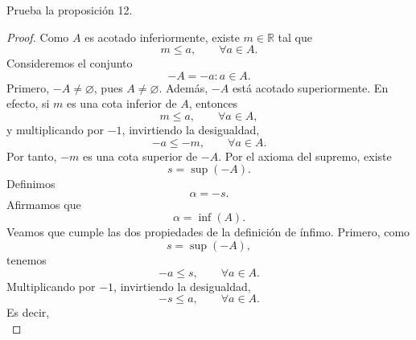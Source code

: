 \documentclass[12pt,a4paper]{article}
\begin{document}
    \begin{problema}
        Prueba la proposición 12.
    \end{problema}

    \begin{proof}
        Como $A$ es acotado inferiormente, existe $m\in\mathbb{R}$ tal que
        \begin{equation*}
            m\leq a,\qquad\forall a\in A.
        \end{equation*}
            Consideremos el conjunto
        \begin{equation*}
            -A={-a:a\in A}.
        \end{equation*}
        Primero, $-A\neq\varnothing$, pues $A\neq\varnothing$. Además, $-A$ está acotado superiormente. En efecto, si $m$ es una cota inferior de $A$, entonces
        \begin{equation*}
            m\leq a,\qquad\forall a\in A,
        \end{equation*}
        y multiplicando por $-1$, invirtiendo la desigualdad,
        \begin{equation*}
            -a\leq-m,\qquad\forall a\in A.
        \end{equation*}
        Por tanto, $-m$ es una cota superior de $-A$. Por el axioma del supremo, existe
        \begin{equation*}
            s=\sup(-A).
        \end{equation*}
        Definimos
        \begin{equation*}
            \alpha=-s.
        \end{equation*}
        Afirmamos que
        \begin{equation*}
            \alpha=\inf(A).
        \end{equation*}
        Veamos que cumple las dos propiedades de la definición de ínfimo. Primero, como
        \begin{equation*}
            s=\sup(-A),
        \end{equation*}
        tenemos
        \begin{equation*}
            -a\leq s,\qquad\forall a\in A.
        \end{equation*}
        Multiplicando por $-1$, invirtiendo la desigualdad,
        \begin{equation*}
            -s\leq a,\qquad\forall a\in A.
        \end{equation*}
        Es decir,
        \begin{equation*}

\end{equation*}
\end{proof}
\end{document}
